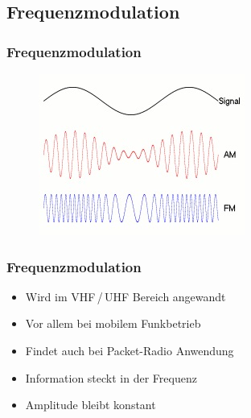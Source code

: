 \subsection[FM]{Frequenzmodulation}
\begin{frame}
\frametitle{Frequenzmodulation}
	\begin{center}
    \begin{figure}
      \includegraphics[width=\textwidth,height=.75\textheight,keepaspectratio]{e14/modulationen.jpg}
    \end{figure}
\end{center}
\end{frame}
\begin{frame}
\frametitle{Frequenzmodulation}
  \begin{center}
	\begin{itemize}
		\item Wird im VHF\,/\,UHF Bereich angewandt
		\item Vor allem bei mobilem Funkbetrieb
		\item Findet auch bei Packet-Radio Anwendung
		\item Information steckt in der Frequenz
		\item Amplitude bleibt konstant
	\end{itemize}
	\end{center}
\end{frame}

